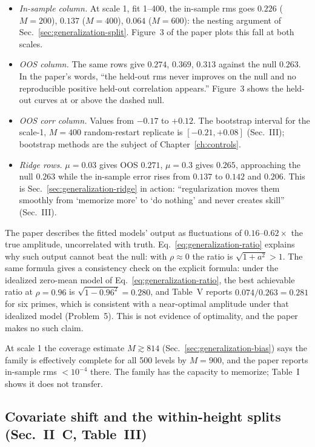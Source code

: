 \begin{itemize}
\item \emph{In-sample column.} At scale 1, fit 1--400, the in-sample rms goes $0.226$ ($M=200$), $0.137$ ($M=400$), $0.064$ ($M=600$): the nesting argument of Sec.~\ref{sec:generalization-split}. Figure~3 of the paper plots this fall at both scales.
\item \emph{OOS column.} The same rows give $0.274$, $0.369$, $0.313$ against the null $0.263$. In the paper's words, ``the held-out rms never improves on the null and no reproducible positive held-out correlation appears.'' Figure~3 shows the held-out curves at or above the dashed null.
\item \emph{OOS corr column.} Values from $-0.17$ to $+0.12$. The bootstrap interval for the scale-1, $M=400$ random-restart replicate is $[-0.21,+0.08]$ (Sec.~III); bootstrap methods are the subject of Chapter~\ref{ch:controls}.
\item \emph{Ridge rows.} $\mu=0.03$ gives OOS $0.271$, $\mu=0.3$ gives $0.265$, approaching the null $0.263$ while the in-sample error rises from $0.137$ to $0.142$ and $0.206$. This is Sec.~\ref{sec:generalization-ridge} in action: ``regularization moves them smoothly from `memorize more' to `do nothing' and never creates skill'' (Sec.~III).
\end{itemize}

The paper describes the fitted models' output as fluctuations of $0.16$--$0.62\times$ the true amplitude, uncorrelated with truth. Eq.~\eqref{eq:generalization-ratio} explains why such output cannot beat the null: with $\rho\approx0$ the ratio is $\sqrt{1+a^2}>1$. The same formula gives a consistency check on the explicit formula: under the idealized zero-mean model of Eq.~\eqref{eq:generalization-ratio}, the best achievable ratio at $\rho=0.96$ is $\sqrt{1-0.96^2}=0.280$, and Table~V reports $0.074/0.263=0.281$ for six primes, which is consistent with a near-optimal amplitude under that idealized model (Problem~5). This is not evidence of optimality, and the paper makes no such claim.

At scale 1 the coverage estimate $M\gtrsim814$ (Sec.~\ref{sec:generalization-bias}) says the family is effectively complete for all 500 levels by $M=900$, and the paper reports in-sample rms $<10^{-4}$ there. The family has the capacity to memorize; Table~I shows it does not transfer.

\subsection{Covariate shift and the within-height splits (Sec.~II~C, Table~III)}

